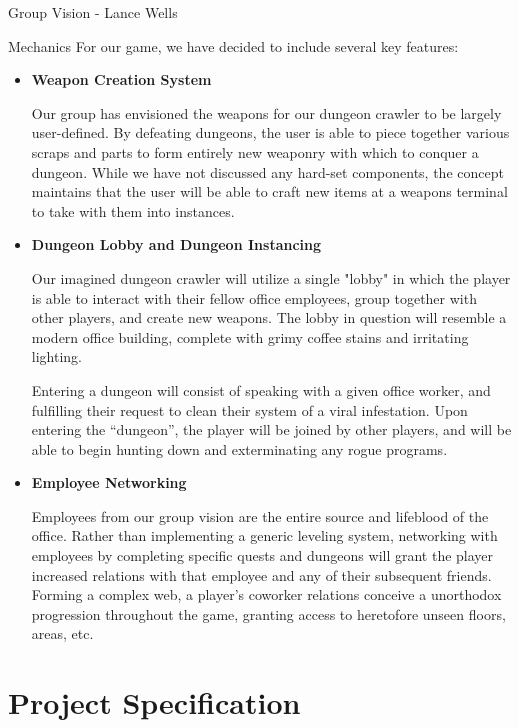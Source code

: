 \documentclass[12pt]{report}
\begin{document}
\begin{section}{Group Vision - Lance Wells}
\begin{subsection}{Mechanics}
For our game, we have decided to include several key features:

\begin{itemize}
\item \textbf{Weapon Creation System}

Our group has envisioned the weapons for our dungeon crawler to be 
largely user-defined. By defeating dungeons, the user is able to piece 
together various scraps and parts to form entirely new weaponry with 
which to conquer a dungeon. While we have not discussed any hard-set 
components, the concept maintains that the user will be able to craft 
new items at a weapons terminal to take with them into instances.

\item \textbf{Dungeon Lobby and Dungeon Instancing}

Our imagined dungeon crawler will utilize a single "lobby" in which the 
player is able to interact with their fellow office employees, group 
together with other players, and create new weapons. The lobby in question 
will resemble a modern office building, complete with grimy coffee stains 
and irritating lighting.

Entering a dungeon will consist of speaking with a given office worker, 
and fulfilling their request to clean their system of a viral infestation. 
Upon entering the ``dungeon'', the player will be joined by other players, 
and will be able to begin hunting down and exterminating any rogue programs.

\item \textbf{Employee Networking}

Employees from our group vision are the entire source and lifeblood of the 
office. Rather than implementing a generic leveling system, networking 
with employees by completing specific quests and dungeons will grant the 
player increased relations with that employee and any of their subsequent 
friends. Forming a complex web, a player's coworker relations conceive a 
unorthodox progression throughout the game, granting access to heretofore 
unseen floors, areas, etc.
\end{itemize}
\end{subsection}
\end{section}

\chapter{Project Specification}
\end{document}
